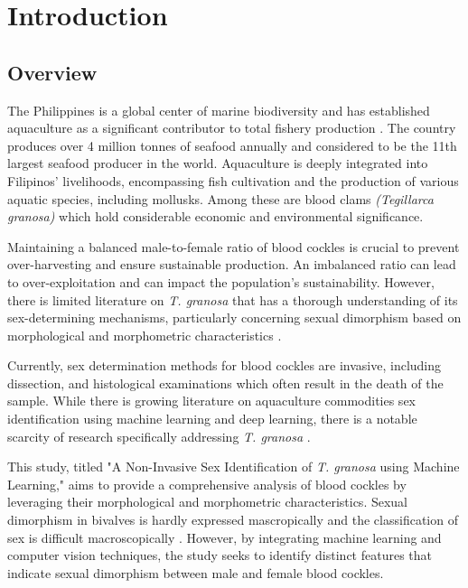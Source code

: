 \chapter{Introduction}
\label{sec:researchdesc}    %

\section{Overview}
\label{sec:overview}

The Philippines is a global center of marine biodiversity and has established aquaculture as a significant contributor to total fishery production \cite{aypa2000, bfar2019}. The country produces over 4 million tonnes of seafood annually and considered to be the 11th largest seafood producer in the world. Aquaculture is deeply integrated into Filipinos' livelihoods, encompassing fish cultivation and the production of various aquatic species, including mollusks. Among these are blood clams \textit{(Tegillarca granosa)} which hold considerable economic and environmental significance.

Maintaining a balanced male-to-female ratio of blood cockles is crucial to prevent over-harvesting and ensure sustainable production. An imbalanced ratio can lead to over-exploitation and can impact the population's sustainability. However, there is limited literature on \textit{T. granosa} that has a thorough understanding of its sex-determining mechanisms, particularly concerning sexual dimorphism based on morphological and morphometric characteristics \cite{breton2017sex}.

Currently, sex determination methods for blood cockles are invasive, including dissection, and histological examinations which often result in the death of the sample. While there is growing literature on aquaculture commodities sex identification using machine learning and deep learning, there is a notable scarcity of research specifically addressing \textit{T. granosa} \cite{miranda2023}.

This study, titled "A Non-Invasive Sex Identification of \textit{T. granosa} using Machine Learning," aims to provide a comprehensive analysis of blood cockles by leveraging their morphological and morphometric characteristics. Sexual dimorphism in bivalves is hardly expressed mascropically and the classification of sex is difficult macroscopically \cite{karapunar2021}. However, by integrating machine learning and computer vision techniques, the study seeks to identify distinct features that indicate sexual dimorphism between male and female blood cockles.

